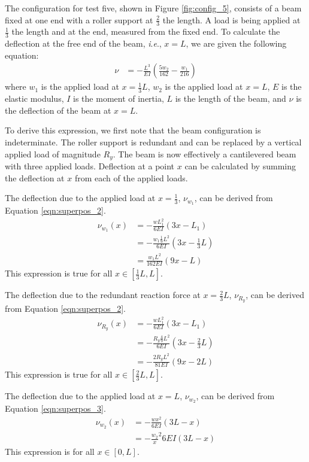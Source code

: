 \documentclass[12 pt]{article}
\newcommand{\ie}{\textit{i}.\textit{e}., }
\begin{document}
The configuration for test five, shown in Figure \ref{fig:config_5}, consists of a beam fixed at one end with a roller support at $\frac{2}{3}$ the length. A load is being applied at $\frac{1}{3}$ the length and at the end, measured from the fixed end. To calculate the deflection at the free end of the beam, \ie $x=L$, we are given the following equation:
\begin{align} \label{eqn:config_5-deflection}
	\nu&=-\frac{L^3}{EI}\left(\frac{5w_2}{162}-\frac{w_1}{216}\right)
\end{align}
where $w_1$ is the applied load at $x=\frac{1}{3}L$, $w_2$ is the applied load at $x=L$, $E$ is the elastic modulus, $I$ is the moment of inertia, $L$ is the length of the beam, and $\nu$ is the deflection of the beam at $x=L$.

To derive this expression, we first note that the beam configuration is indeterminate. The roller support is redundant and can be replaced by a vertical applied load of magnitude $R_y$. The beam is now effectively a cantilevered beam with three applied loads. Deflection at a point $x$ can be calculated by summing the deflection at $x$ from each of the applied loads.

The deflection due to the applied load at $x=\frac{1}{3}$, $\nu_{w_1}$, can be derived from Equation \ref{eqn:superpos_2}.
\begin{align*}
	\nu_{w_1}(x)&=-\frac{wL_1^2}{6EI}(3x-L_1)\\
	&=-\frac{w_1\frac{1}{9}L^2}{6EI}(3x-\frac{1}{3}L)\\
	&=\frac{w_1L^2}{162EI}(9x-L)
\end{align*}
This expression is true for all $x\in[\frac{1}{3}L,L]$.

The deflection due to the redundant reaction force at $x=\frac{2}{3}L$, $\nu_{R_y}$, can be derived from Equation \ref{eqn:superpos_2}.
\begin{align*}
	\nu_{R_y}(x)&=-\frac{wL_1^2}{6EI}(3x-L_1)\\
	&=-\frac{R_y\frac{4}{9}L^2}{6EI}(3x-\frac{2}{3}L)\\
	&=-\frac{2R_yL^2}{81EI}(9x-2L)
\end{align*}
This expression is true for all $x\in[\frac{2}{3}L,L]$.

The deflection due to the applied load at $x=L$, $\nu_{w_2}$, can be derived from Equation \ref{eqn:superpos_3}.
\begin{align*}
	\nu_{w_2}(x)&=-\frac{wx^2}{6EI}(3L-x)\\
	&=-\frac{w_2}x^2{6EI}(3L-x)
\end{align*}
This expression is for all $x\in[0,L]$.
\end{document}
